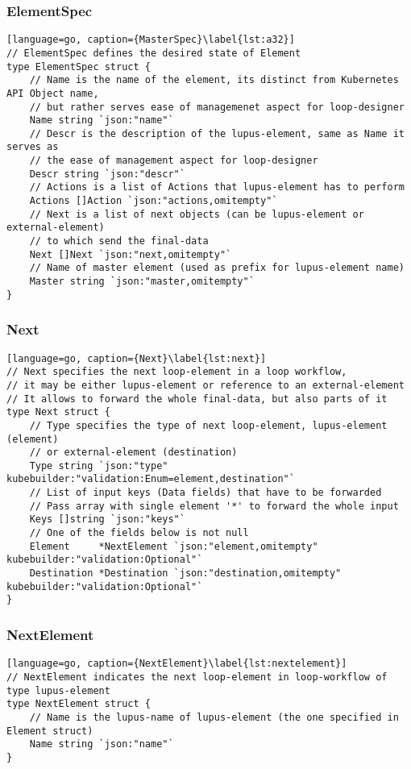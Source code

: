 \subsubsection{ElementSpec}
\begin{lstlisting}[language=go, caption={MasterSpec}\label{lst:a32}]
// ElementSpec defines the desired state of Element
type ElementSpec struct {
	// Name is the name of the element, its distinct from Kubernetes API Object name, 
    // but rather serves ease of managemenet aspect for loop-designer
	Name string `json:"name"`
	// Descr is the description of the lupus-element, same as Name it serves as 
    // the ease of management aspect for loop-designer
	Descr string `json:"descr"`
	// Actions is a list of Actions that lupus-element has to perform
	Actions []Action `json:"actions,omitempty"`
	// Next is a list of next objects (can be lupus-element or external-element) 
    // to which send the final-data
	Next []Next `json:"next,omitempty"`
	// Name of master element (used as prefix for lupus-element name)
	Master string `json:"master,omitempty"`
}
\end{lstlisting}

\subsubsection{Next}
\begin{lstlisting}[language=go, caption={Next}\label{lst:next}]
// Next specifies the next loop-element in a loop workflow, 
// it may be either lupus-element or reference to an external-element
// It allows to forward the whole final-data, but also parts of it
type Next struct {
	// Type specifies the type of next loop-element, lupus-element (element) 
    // or external-element (destination)
	Type string `json:"type" kubebuilder:"validation:Enum=element,destination"`
	// List of input keys (Data fields) that have to be forwarded
	// Pass array with single element '*' to forward the whole input
	Keys []string `json:"keys"`
	// One of the fields below is not null
	Element     *NextElement `json:"element,omitempty" kubebuilder:"validation:Optional"`
	Destination *Destination `json:"destination,omitempty" kubebuilder:"validation:Optional"`
}
\end{lstlisting}

\subsubsection{NextElement}
\begin{lstlisting}[language=go, caption={NextElement}\label{lst:nextelement}]
// NextElement indicates the next loop-element in loop-workflow of type lupus-element
type NextElement struct {
	// Name is the lupus-name of lupus-element (the one specified in Element struct)
	Name string `json:"name"`
}
\end{lstlisting}

